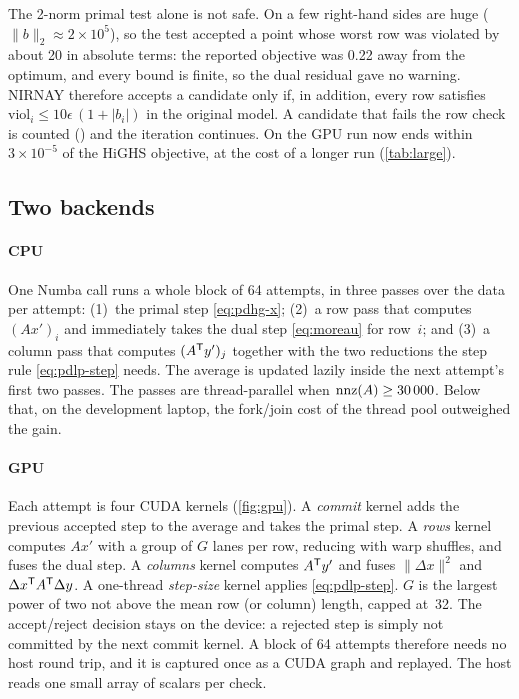 The 2-norm primal test alone is not safe. On  a few right-hand sides are huge
($\|b\|_2\approx2\times10^5$), so the test accepted a point whose worst row was violated by about 20 in
absolute terms: the reported objective was 0.22 away from the optimum, and every bound is finite, so
the dual residual gave no warning. NIRNAY therefore accepts a candidate only if, in addition, every
row satisfies $\mathrm{viol}_i\le10\epsilon\,(1+|b_i|)$ in the original model. A candidate that
fails the row check is counted () and the iteration continues. On
 the GPU run now ends within $3\times10^{-5}$ of the HiGHS objective, at the cost of a
longer run (\cref{tab:large}).

\subsection{Two backends}
\paragraph{CPU}
One Numba call runs a whole block of 64 attempts, in three passes over the data per attempt:
(1)~the primal step \eqref{eq:pdhg-x}; (2)~a row pass that computes $(Ax')_i$ and immediately takes
the dual step \eqref{eq:moreau} for row~$i$; and (3)~a column pass that computes $(A^{\mathsf{T}} y')_j$ together
with the two reductions the step rule \eqref{eq:pdlp-step} needs. The average is updated lazily inside
the next attempt's first two passes. The passes are thread-parallel when $\operatorname{nnz}(A)\ge30\,000$. Below
that, on the development laptop, the fork/join cost of the thread pool outweighed the gain.

\paragraph{GPU}
Each attempt is four CUDA kernels (\cref{fig:gpu}). A \emph{commit} kernel adds the previous accepted
step to the average and takes the primal step. A \emph{rows} kernel computes $Ax'$ with a group of $G$
lanes per row, reducing with warp shuffles, and fuses the dual step. A \emph{columns} kernel computes
$A^{\mathsf{T}} y'$ and fuses $\|\Delta x\|^2$ and $\Delta x^{\mathsf{T}} A^{\mathsf{T}}\Delta y$. A one-thread \emph{step-size}
kernel applies \eqref{eq:pdlp-step}. $G$ is the largest power of two not above the mean row (or
column) length, capped at~32. The accept/reject decision stays on the device: a rejected step is simply
not committed by the next commit kernel. A block of 64 attempts therefore needs no host round trip,
and it is captured once as a CUDA graph and replayed. The host reads one small array of scalars per
check.

